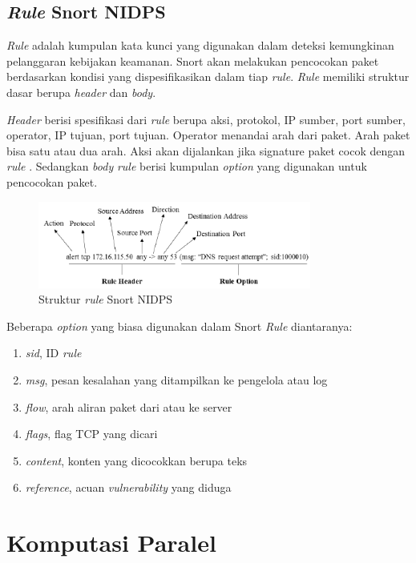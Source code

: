   \subsection{\emph{Rule} Snort NIDPS}

    \emph{Rule} adalah kumpulan kata kunci yang digunakan dalam deteksi kemungkinan pelanggaran kebijakan keamanan. Snort akan melakukan pencocokan paket berdasarkan kondisi yang dispesifikasikan dalam tiap \emph{rule}. \emph{Rule} memiliki struktur dasar berupa \emph{header} dan \emph{body}. 

    \emph{Header} berisi spesifikasi dari  \emph{rule} berupa aksi, protokol, IP sumber, port sumber, operator, IP tujuan, port tujuan. Operator menandai arah dari paket. Arah paket bisa satu atau dua arah. Aksi akan dijalankan jika signature paket cocok dengan \emph{rule} \citep{5358130}. Sedangkan \emph{body} \emph{rule} berisi kumpulan \emph{option} yang digunakan untuk pencocokan paket. 

    \begin{figure}[htb]
      \centering
      \includegraphics[width=0.8\textwidth]{resources/rule.png}
      \caption[Struktur \emph{rule} Snort NIDPS]{Struktur \emph{rule} Snort NIDPS \citep{khamphakdee2014}}
    \end{figure}

    Beberapa \emph{option} yang biasa digunakan dalam Snort \emph{Rule} diantaranya:
    \begin{enumerate} 
      \item \emph{sid}, ID \emph{rule}
      \item \emph{msg}, pesan kesalahan yang ditampilkan ke pengelola atau log
      \item \emph{flow}, arah aliran paket dari atau ke server
      \item \emph{flags}, flag TCP yang dicari
      \item \emph{content}, konten yang dicocokkan berupa teks
      \item \emph{reference}, acuan \emph{vulnerability} yang diduga
    \end{enumerate} 

\section{Komputasi Paralel}

